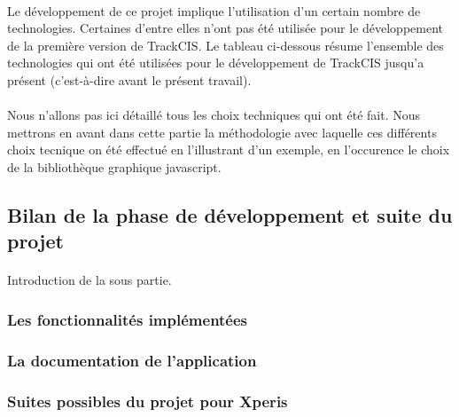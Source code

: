 			\paragraph{}%
			Le développement de ce projet implique l'utilisation d'un certain nombre de
			technologies. Certaines d'entre elles n'ont pas été utilisée pour le
			développement de la première version de TrackCIS.
			Le tableau ci-dessous résume l'ensemble des technologies qui ont été
			utilisées pour le développement de TrackCIS jusqu'a présent (c'est-à-dire
			avant le présent travail).
			
			\paragraph{}%
			Nous n'allons pas ici détaillé tous les choix techniques qui ont été fait.
			Nous mettrons en avant dans cette partie la méthodologie avec laquelle ces
			différents choix tecnique on été effectué en l'illustrant d'un exemple, en
			l'occurence le choix de la bibliothèque graphique javascript.
	
	\subsection{Bilan de la phase de développement et suite du projet}
		\paragraph{}
		Introduction de la sous partie.
		
		\subsubsection{Les fonctionnalités implémentées}
		\subsubsection{La documentation de l'application}
			\paragraph{}%
			\paragraph{}%
			\paragraph{}%
		\subsubsection{Suites possibles du projet pour Xperis}